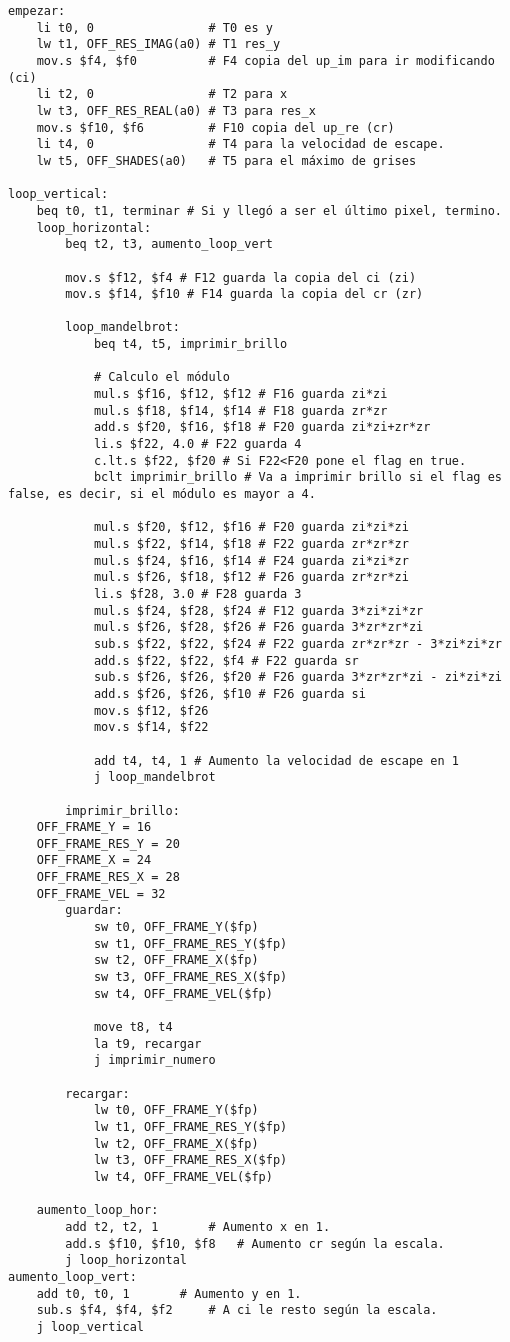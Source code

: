 \documentclass[a4paper,10pt]{article}
\begin{document}
\begin{verbatim}
empezar:
	li t0, 0 				# T0 es y
	lw t1, OFF_RES_IMAG(a0) # T1 res_y
	mov.s $f4, $f0 			# F4 copia del up_im para ir modificando (ci)
	li t2, 0 				# T2 para x
	lw t3, OFF_RES_REAL(a0) # T3 para res_x
	mov.s $f10, $f6 		# F10 copia del up_re (cr)
	li t4, 0 				# T4 para la velocidad de escape.
	lw t5, OFF_SHADES(a0)	# T5 para el máximo de grises

loop_vertical:
	beq t0, t1, terminar # Si y llegó a ser el último pixel, termino.
	loop_horizontal:
		beq t2, t3, aumento_loop_vert

		mov.s $f12, $f4 # F12 guarda la copia del ci (zi)
		mov.s $f14, $f10 # F14 guarda la copia del cr (zr)

		loop_mandelbrot:
			beq t4, t5, imprimir_brillo

			# Calculo el módulo
			mul.s $f16, $f12, $f12 # F16 guarda zi*zi
			mul.s $f18, $f14, $f14 # F18 guarda zr*zr
			add.s $f20, $f16, $f18 # F20 guarda zi*zi+zr*zr
			li.s $f22, 4.0 # F22 guarda 4
			c.lt.s $f22, $f20 # Si F22<F20 pone el flag en true.
			bclt imprimir_brillo # Va a imprimir brillo si el flag es false, es decir, si el módulo es mayor a 4.

			mul.s $f20, $f12, $f16 # F20 guarda zi*zi*zi
			mul.s $f22, $f14, $f18 # F22 guarda zr*zr*zr
			mul.s $f24, $f16, $f14 # F24 guarda zi*zi*zr
			mul.s $f26, $f18, $f12 # F26 guarda zr*zr*zi
			li.s $f28, 3.0 # F28 guarda 3
			mul.s $f24, $f28, $f24 # F12 guarda 3*zi*zi*zr
			mul.s $f26, $f28, $f26 # F26 guarda 3*zr*zr*zi
			sub.s $f22, $f22, $f24 # F22 guarda zr*zr*zr - 3*zi*zi*zr
			add.s $f22, $f22, $f4 # F22 guarda sr
			sub.s $f26, $f26, $f20 # F26 guarda 3*zr*zr*zi - zi*zi*zi
			add.s $f26, $f26, $f10 # F26 guarda si
			mov.s $f12, $f26
			mov.s $f14, $f22

			add t4, t4, 1 # Aumento la velocidad de escape en 1
			j loop_mandelbrot

		imprimir_brillo:
	OFF_FRAME_Y = 16
	OFF_FRAME_RES_Y = 20
	OFF_FRAME_X = 24
	OFF_FRAME_RES_X = 28
	OFF_FRAME_VEL = 32
		guardar:	
			sw t0, OFF_FRAME_Y($fp)
			sw t1, OFF_FRAME_RES_Y($fp)
			sw t2, OFF_FRAME_X($fp)
			sw t3, OFF_FRAME_RES_X($fp)
			sw t4, OFF_FRAME_VEL($fp)
			
			move t8, t4
			la t9, recargar
			j imprimir_numero
		
		recargar:
			lw t0, OFF_FRAME_Y($fp)
			lw t1, OFF_FRAME_RES_Y($fp)
			lw t2, OFF_FRAME_X($fp)
			lw t3, OFF_FRAME_RES_X($fp)
			lw t4, OFF_FRAME_VEL($fp)

	aumento_loop_hor:
		add t2, t2, 1 		# Aumento x en 1.
		add.s $f10, $f10, $f8 	# Aumento cr según la escala.
		j loop_horizontal
aumento_loop_vert:
	add t0, t0, 1 		# Aumento y en 1.
	sub.s $f4, $f4, $f2 	# A ci le resto según la escala.
	j loop_vertical



\end{verbatim}
\end{document}
